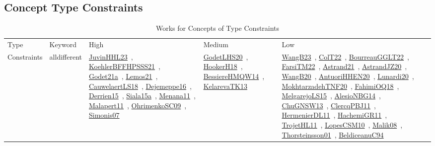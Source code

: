 \clearpage
\subsection{Concept Type Constraints}
\label{sec:Constraints}
{\scriptsize
\begin{longtable}{lp{3cm}>{\raggedright\arraybackslash}p{6cm}>{\raggedright\arraybackslash}p{6cm}>{\raggedright\arraybackslash}p{8cm}}
\rowcolor{white}\caption{Works for Concepts of Type Constraints}\\ \toprule
\rowcolor{white}Type & Keyword & High & Medium & Low\\ \midrule\endhead
\bottomrule
\endfoot
Constraints & alldifferent & \href{works/JuvinHHL23.pdf}{JuvinHHL23}~\cite{JuvinHHL23}, \href{works/KoehlerBFFHPSSS21.pdf}{KoehlerBFFHPSSS21}~\cite{KoehlerBFFHPSSS21}, \href{works/Godet21a.pdf}{Godet21a}~\cite{Godet21a}, \href{works/Lemos21.pdf}{Lemos21}~\cite{Lemos21}, \href{works/CauwelaertLS18.pdf}{CauwelaertLS18}~\cite{CauwelaertLS18}, \href{works/Dejemeppe16.pdf}{Dejemeppe16}~\cite{Dejemeppe16}, \href{works/Derrien15.pdf}{Derrien15}~\cite{Derrien15}, \href{works/Siala15a.pdf}{Siala15a}~\cite{Siala15a}, \href{works/Menana11.pdf}{Menana11}~\cite{Menana11}, \href{works/Malapert11.pdf}{Malapert11}~\cite{Malapert11}, \href{works/OhrimenkoSC09.pdf}{OhrimenkoSC09}~\cite{OhrimenkoSC09}, \href{works/Simonis07.pdf}{Simonis07}~\cite{Simonis07} & \href{works/GodetLHS20.pdf}{GodetLHS20}~\cite{GodetLHS20}, \href{works/HookerH18.pdf}{HookerH18}~\cite{HookerH18}, \href{works/BessiereHMQW14.pdf}{BessiereHMQW14}~\cite{BessiereHMQW14}, \href{works/KelarevaTK13.pdf}{KelarevaTK13}~\cite{KelarevaTK13} & \href{works/WangB23.pdf}{WangB23}~\cite{WangB23}, \href{works/ColT22.pdf}{ColT22}~\cite{ColT22}, \href{works/BourreauGGLT22.pdf}{BourreauGGLT22}~\cite{BourreauGGLT22}, \href{works/FarsiTM22.pdf}{FarsiTM22}~\cite{FarsiTM22}, \href{works/Astrand21.pdf}{Astrand21}~\cite{Astrand21}, \href{works/AstrandJZ20.pdf}{AstrandJZ20}~\cite{AstrandJZ20}, \href{works/WangB20.pdf}{WangB20}~\cite{WangB20}, \href{works/AntuoriHHEN20.pdf}{AntuoriHHEN20}~\cite{AntuoriHHEN20}, \href{works/Lunardi20.pdf}{Lunardi20}~\cite{Lunardi20}, \href{works/MokhtarzadehTNF20.pdf}{MokhtarzadehTNF20}~\cite{MokhtarzadehTNF20}, \href{works/FahimiOQ18.pdf}{FahimiOQ18}~\cite{FahimiOQ18}, \href{works/MelgarejoLS15.pdf}{MelgarejoLS15}~\cite{MelgarejoLS15}, \href{works/AlesioNBG14.pdf}{AlesioNBG14}~\cite{AlesioNBG14}, \href{works/ChuGNSW13.pdf}{ChuGNSW13}~\cite{ChuGNSW13}, \href{works/ClercqPBJ11.pdf}{ClercqPBJ11}~\cite{ClercqPBJ11}, \href{works/HermenierDL11.pdf}{HermenierDL11}~\cite{HermenierDL11}, \href{works/HachemiGR11.pdf}{HachemiGR11}~\cite{HachemiGR11}, \href{works/TrojetHL11.pdf}{TrojetHL11}~\cite{TrojetHL11}, \href{works/LopesCSM10.pdf}{LopesCSM10}~\cite{LopesCSM10}, \href{works/Malik08.pdf}{Malik08}~\cite{Malik08}, \href{works/Thorsteinsson01.pdf}{Thorsteinsson01}~\cite{Thorsteinsson01}, \href{works/BeldiceanuC94.pdf}{BeldiceanuC94}~\cite{BeldiceanuC94}\\

\end{longtable}}
